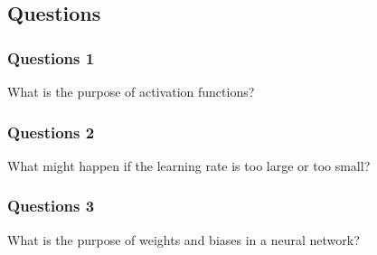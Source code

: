 \subsection{Questions}

\subsubsection{Questions 1}

What is the purpose of activation functions?

\subsubsection{Questions 2}

What might happen if the learning rate is too large or too small?  

\subsubsection{Questions 3}

What is the purpose of weights and biases in a neural network? 